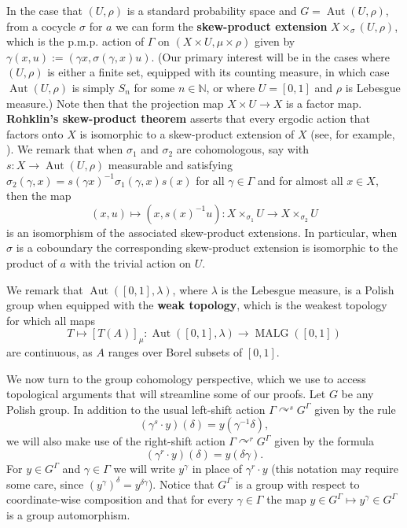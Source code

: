 \documentclass[12pt]{amsart}
\theoremstyle{definition}
\def\bb{\mathbb}
\def\bb{\mathbb}
\DeclareMathOperator{\Aut}{Aut}
\def \Malg{\operatorname{MALG}}
\newcommand{\pmp}{p{$.$}m{$.$}p{$.$}}
\newcommand{\acts}{\curvearrowright}
\begin{document}
In the case that $(U,\rho)$ is a standard probability space and $G = \Aut(U, \rho)$, from a cocycle $\sigma$ for $a$ we can form the \textbf{skew-product extension} $X\times_\sigma (U,\rho)$, which is the {\pmp} action of $\Gamma$ on $(X\times U, \mu \times \rho)$ given by $\gamma(x,u):=(\gamma x,\sigma(\gamma,x)u)$. (Our primary interest will be in the cases where $(U,\rho)$ is either a finite set, equipped with its counting measure, in which case $\Aut(U,\rho)$ is simply $S_n$ for some $n\in \bb N$, or where $U = [0,1]$ and $\rho$ is Lebesgue measure.)  Note then that the projection map $X\times U\to X$ is a factor map.  \textbf{Rohklin's skew-product theorem} asserts that every ergodic action that factors onto $X$ is isomorphic to a skew-product extension of $X$ (see, for example, \cite{glasner}). We remark that when $\sigma_1$ and $\sigma_2$ are cohomologous, say with $s:X\to \Aut(U, \rho)$ measurable and satisfying $\sigma_2(\gamma,x)=s(\gamma x)^{-1}\sigma_1(\gamma,x)s(x)$ for all $\gamma\in \Gamma$ and for almost all $x\in X$, then the map $$(x,u)\mapsto (x,s(x)^{-1}u):X\times_{\sigma_1}U\to X\times_{\sigma_2}U$$ is an isomorphism of the associated skew-product extensions. In particular, when $\sigma$ is a coboundary the corresponding skew-product extension is isomorphic to the product of $a$ with the trivial action on $U$.

We remark that $\Aut([0,1], \lambda)$, where $\lambda$ is the Lebesgue measure, is a Polish group when equipped with the \textbf{weak topology}, which is the weakest topology for which all maps $$T\mapsto [T(A)]_\mu:\Aut([0,1],\lambda)\to \Malg([0,1])$$ are continuous, as $A$ ranges over Borel subsets of $[0,1]$.

We now turn to the group cohomology perspective, which we use to access topological arguments that will streamline some of our proofs. Let $G$ be any Polish group. In addition to the usual left-shift action $\Gamma \acts^s G^\Gamma$ given by the rule
\[(\gamma^s \cdot y)(\delta) = y(\gamma^{-1} \delta),\]
we will also make use of the right-shift action $\Gamma \acts^r G^\Gamma$ given by the formula
\[(\gamma^r \cdot y)(\delta) = y(\delta \gamma).\]
For $y \in G^\Gamma$ and $\gamma \in \Gamma$ we will write $y^\gamma$ in place of $\gamma^r \cdot y$ (this notation may require some care, since $(y^\gamma)^\delta = y^{\delta \gamma}$). Notice that $G^\Gamma$ is a group with respect to coordinate-wise composition and that for every $\gamma \in \Gamma$ the map $y \in G^\Gamma \mapsto y^\gamma \in G^\Gamma$ is a group automorphism.
\end{document}
